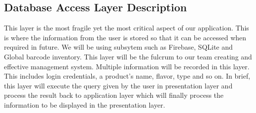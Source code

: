 \subsection{Database Access Layer Description}
This layer is the most fragile yet the most critical aspect of our application. This is where the information from the user is stored so that it can be accessed when required in future. We will be using subsytem such as Firebase, SQLite and Global barcode inventory. This layer will be the fulcrum to our team creating and effective management system. Multiple information will be recorded in this layer. This includes login credentials, a product’s name, flavor, type and so on. In brief, this layer will execute the query given by the user in presentation layer and process the result back to application layer which will finally process the information to be displayed in the presentation layer.